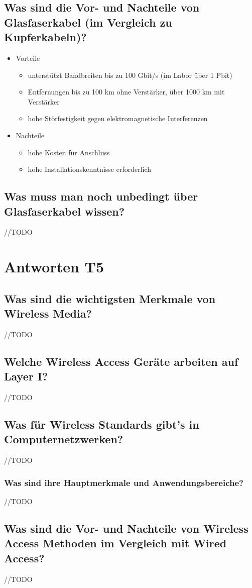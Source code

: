 \subsection*{Was sind die Vor- und Nachteile von Glasfaserkabel (im Vergleich zu Kupferkabeln)?}
\begin{itemize}
    \item Vorteile
    \begin{itemize}
        \item unterstützt Bandbreiten bis zu 100 Gbit/s (im Labor über 1 Pbit)
        \item Entfernungen bis zu 100 km ohne Verstärker, über 1000 km mit Verstärker
        \item hohe Störfestigkeit gegen elektromagnetische Interferenzen
    \end{itemize}
    \item Nachteile
    \begin{itemize}
        \item hohe Kosten für Anschluss
        \item hohe Installationskenntnisse erforderlich
    \end{itemize}
\end{itemize}

\subsection*{Was muss man noch unbedingt über Glasfaserkabel wissen?}
//TODO

\section{Antworten T5}
\subsection*{Was sind die wichtigsten Merkmale von \flqq{}Wireless Media\frqq?}
//TODO
\subsection*{Welche Wireless Access Geräte arbeiten auf Layer I?}
//TODO
\subsection*{Was für Wireless Standards gibt’s in Computernetzwerken?}
//TODO
\subsubsection*{Was sind ihre Hauptmerkmale und Anwendungsbereiche?}
//TODO
\subsection*{Was sind die Vor- und Nachteile von \flqq{}Wireless Access\frqq{} Methoden im Vergleich mit \flqq{}Wired Access\frqq?}
//TODO